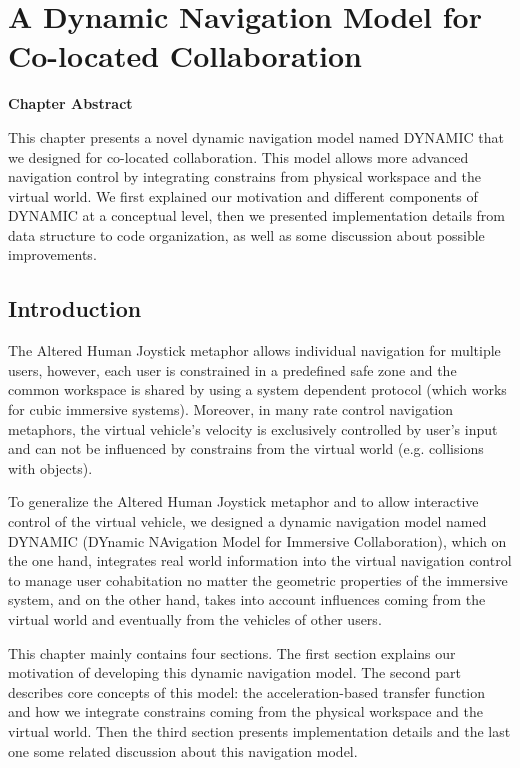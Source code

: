 \chapter{A Dynamic Navigation Model for Co-located Collaboration}
\label{chapter:dynamic_model}
\pagebreak

\textbf{Chapter Abstract}

This chapter presents a novel dynamic navigation model named DYNAMIC that we designed for co-located collaboration. This model allows more advanced navigation control by integrating constrains from physical workspace and the virtual world. We first explained our motivation and different components of DYNAMIC at a conceptual level, then we presented implementation details from data structure to code organization, as well as some discussion about possible improvements.

\vspace*{2\baselineskip}

\minitoc

\newpage
\section{Introduction}
The Altered Human Joystick metaphor allows individual navigation for multiple users, however, each user is constrained in a predefined safe zone and the common workspace is shared by using a system dependent protocol (which works for cubic immersive systems). Moreover, in many rate control navigation metaphors, the virtual vehicle's velocity is exclusively controlled by user's input and can not be influenced by constrains from the virtual world (e.g. collisions with objects). 

To generalize the Altered Human Joystick metaphor and to allow interactive control of the virtual vehicle, we designed a dynamic navigation model named DYNAMIC (DYnamic NAvigation Model for Immersive Collaboration), which on the one hand, integrates real world information into the virtual navigation control to manage user cohabitation no matter the geometric properties of the immersive system, and on the other hand, takes into account influences coming from the virtual world and eventually from the vehicles of other users.

This chapter mainly contains four sections. The first section explains our motivation of developing this dynamic navigation model. The second part describes core concepts of this model: the acceleration-based transfer function and how we integrate constrains coming from the physical workspace and the virtual world. Then the third section presents implementation details and the last one some related discussion about this navigation model.


